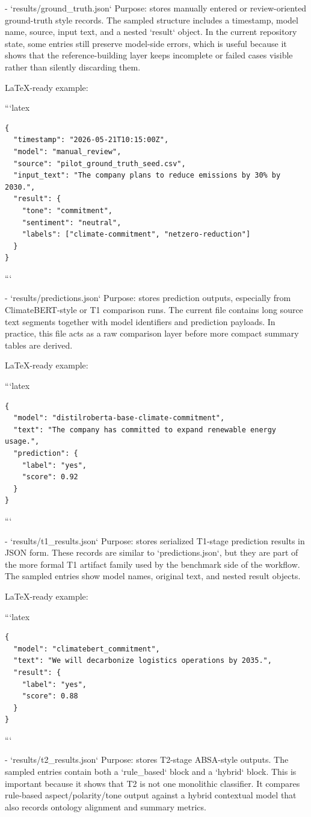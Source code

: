 - `results/ground_truth.json`
  Purpose:
  stores manually entered or review-oriented ground-truth style records.
  The sampled structure includes a timestamp, model name, source, input text, and a nested `result` object. In the current repository state, some entries still preserve model-side errors, which is useful because it shows that the reference-building layer keeps incomplete or failed cases visible rather than silently discarding them.

  LaTeX-ready example:

```latex
\begin{verbatim}
{
  "timestamp": "2026-05-21T10:15:00Z",
  "model": "manual_review",
  "source": "pilot_ground_truth_seed.csv",
  "input_text": "The company plans to reduce emissions by 30% by 2030.",
  "result": {
    "tone": "commitment",
    "sentiment": "neutral",
    "labels": ["climate-commitment", "netzero-reduction"]
  }
}
\end{verbatim}
```

- `results/predictions.json`
  Purpose:
  stores prediction outputs, especially from ClimateBERT-style or T1 comparison runs.
  The current file contains long source text segments together with model identifiers and prediction payloads. In practice, this file acts as a raw comparison layer before more compact summary tables are derived.

  LaTeX-ready example:

```latex
\begin{verbatim}
{
  "model": "distilroberta-base-climate-commitment",
  "text": "The company has committed to expand renewable energy usage.",
  "prediction": {
    "label": "yes",
    "score": 0.92
  }
}
\end{verbatim}
```

- `results/t1_results.json`
  Purpose:
  stores serialized T1-stage prediction results in JSON form.
  These records are similar to `predictions.json`, but they are part of the more formal T1 artifact family used by the benchmark side of the workflow. The sampled entries show model names, original text, and nested result objects.

  LaTeX-ready example:

```latex
\begin{verbatim}
{
  "model": "climatebert_commitment",
  "text": "We will decarbonize logistics operations by 2035.",
  "result": {
    "label": "yes",
    "score": 0.88
  }
}
\end{verbatim}
```

- `results/t2_results.json`
  Purpose:
  stores T2-stage ABSA-style outputs.
  The sampled entries contain both a `rule_based` block and a `hybrid` block. This is important because it shows that T2 is not one monolithic classifier. It compares rule-based aspect/polarity/tone output against a hybrid contextual model that also records ontology alignment and summary metrics.

